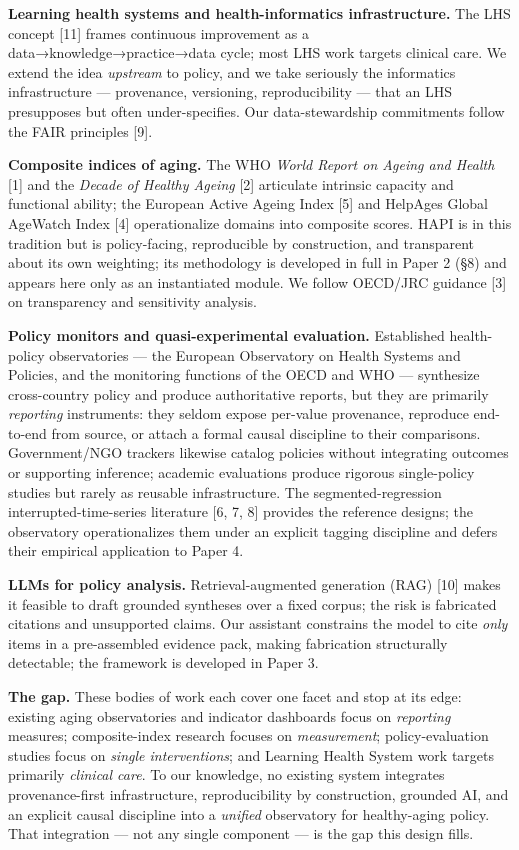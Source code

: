 \documentclass[
  11pt,
]{article}
\begin{document}
\textbf{Learning health systems and health-informatics infrastructure.}
The LHS concept {[}11{]} frames continuous improvement as a
data→knowledge→practice→data cycle; most LHS work targets clinical care.
We extend the idea \emph{upstream} to policy, and we take seriously the
informatics infrastructure --- provenance, versioning, reproducibility
--- that an LHS presupposes but often under-specifies. Our
data-stewardship commitments follow the FAIR principles {[}9{]}.

\textbf{Composite indices of aging.} The WHO \emph{World Report on
Ageing and Health} {[}1{]} and the \emph{Decade of Healthy Ageing}
{[}2{]} articulate intrinsic capacity and functional ability; the
European Active Ageing Index {[}5{]} and HelpAge\textquotesingle s
Global AgeWatch Index {[}4{]} operationalize domains into composite
scores. HAPI is in this tradition but is policy-facing, reproducible by
construction, and transparent about its own weighting; its methodology
is developed in full in Paper 2 (§8) and appears here only as an
instantiated module. We follow OECD/JRC guidance {[}3{]} on transparency
and sensitivity analysis.

\textbf{Policy monitors and quasi-experimental evaluation.} Established
health-policy observatories --- the European Observatory on Health
Systems and Policies, and the monitoring functions of the OECD and WHO
--- synthesize cross-country policy and produce authoritative reports,
but they are primarily \emph{reporting} instruments: they seldom expose
per-value provenance, reproduce end-to-end from source, or attach a
formal causal discipline to their comparisons. Government/NGO trackers
likewise catalog policies without integrating outcomes or supporting
inference; academic evaluations produce rigorous single-policy studies
but rarely as reusable infrastructure. The segmented-regression
interrupted-time-series literature {[}6, 7, 8{]} provides the reference
designs; the observatory operationalizes them under an explicit tagging
discipline and defers their empirical application to Paper 4.

\textbf{LLMs for policy analysis.} Retrieval-augmented generation (RAG)
{[}10{]} makes it feasible to draft grounded syntheses over a fixed
corpus; the risk is fabricated citations and unsupported claims. Our
assistant constrains the model to cite \emph{only} items in a
pre-assembled evidence pack, making fabrication structurally detectable;
the framework is developed in Paper 3.

\textbf{The gap.} These bodies of work each cover one facet and stop at
its edge: existing aging observatories and indicator dashboards focus on
\emph{reporting} measures; composite-index research focuses on
\emph{measurement}; policy-evaluation studies focus on \emph{single
interventions}; and Learning Health System work targets primarily
\emph{clinical care}. To our knowledge, no existing system integrates
provenance-first infrastructure, reproducibility by construction,
grounded AI, and an explicit causal discipline into a \emph{unified}
observatory for healthy-aging policy. That integration --- not any
single component --- is the gap this design fills.
\end{document}
